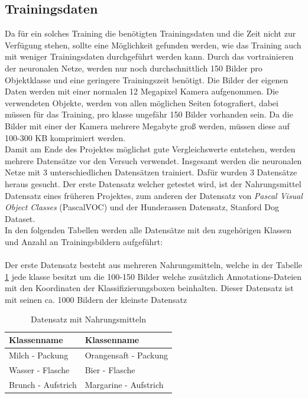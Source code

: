 \documentclass[a4paper,12pt,oneside]{article}
\begin{document}
  \subsection{Trainingsdaten}\label{s.tdaten}
Da für ein solches Training die benötigten Trainingsdaten und die Zeit nicht zur Verfügung stehen, sollte eine Möglichkeit gefunden werden, wie das Training auch mit weniger Trainingsdaten durchgeführt werden kann. Durch das vortrainieren der neuronalen Netze, werden nur noch durchschnittlich 150 Bilder pro Objektklasse und eine geringere Trainingszeit benötigt. Die Bilder der eigenen Daten werden mit einer normalen 12 Megapixel Kamera aufgenommen. Die verwendeten Objekte, werden von allen möglichen Seiten fotografiert, dabei müssen für das Training, pro klasse ungefähr 150 Bilder vorhanden sein. Da die Bilder mit einer der Kamera mehrere Megabyte groß werden, müssen diese auf 100-300 KB komprimiert werden.\\
Damit am Ende des Projektes möglichst gute Vergleichswerte entstehen, werden mehrere Datensätze vor den Versuch verwendet. Insgesamt werden die neuronalen Netze mit 3 unterschiedlichen Datensätzen trainiert. Dafür wurden 3 Datensätze heraus gesucht. Der erste Datensatz welcher getestet wird, ist der Nahrungsmittel Datensatz eines früheren Projektes, zum anderen der Datensatz von \textit{Pascal Visual Object Classes} (PascalVOC) und der Hunderassen Datensatz, Stanford Dog Dataset.\\
In den folgenden Tabellen werden alle Datensätze mit den zugehörigen Klassen und Anzahl an Trainingsbildern aufgeführt:\\\\
Der erste Datensatz besteht aus mehreren Nahrungsmitteln, welche in der Tabelle \ref{tab:nahrungsmittel} jede klasse besitzt um die 100-150 Bilder welche zusätzlich Annotations-Dateien mit den Koordinaten der Klassifizierungsboxen beinhalten. Dieser Datensatz ist mit seinen ca. 1000 Bildern der kleinste Datensatz 
\begin{table}
[h]
\caption{Datensatz mit Nahrungsmitteln}
\centering
\begin{tabular}{|l|l|}
\hline
Klassenname & Klassenname\\
\hline
Milch - Packung & Orangensaft - Packung\\
Wasser - Flasche & Bier - Flasche\\
Brunch - Aufstrich & Margarine - Aufstrich\\
\hline
\end{tabular}
\label{tab:nahrungsmittel}
\end{table}\\
\end{document}

